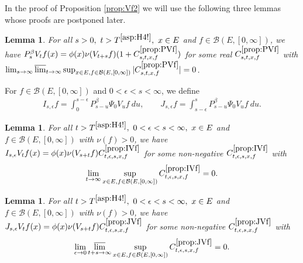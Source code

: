 \documentclass[12pt,a4paper]{amsart}
\numberwithin{equation}{section}
\theoremstyle{plain}
\newtheorem{lem}[thm]{Lemma}
\theoremstyle{definition}
\theoremstyle{remark}
\begin{document}
	In the proof of Proposition \ref{prop:Vf2} we will use the following three lemmas whose proofs are postponed later.

\begin{lem} \label{prop:PVf}
	For all $s> 0,~t> T^{\eqref{asp:H4!}},~ x\in E$ and $f\in \mathcal B(E,[0,\infty])$, we have $P_s^\beta V_t f(x) = \phi(x) \nu(V_{t+s}f) (1+C^{\ref{prop:PVf}}_{s,t,x,f})$ for some real $C^{\ref{prop:PVf}}_{s,t,x,f}$ with 
	$\lim_{s\to \infty} \varlimsup_{t\to \infty} \sup_{x\in E, f\in \mathcal B(E,[0,\infty])} 
	|C^{\ref{prop:PVf}}_{s,t,x,f}| = 0$.
\end{lem}

For $f\in \mathcal B(E,[0,\infty])$ and $0 < \epsilon < s < \infty$, we define
\begin{align}
	I_{s,\epsilon} f
 	= \int_0^{s - \epsilon} P_{s - u}^\beta \Psi_0 V_u f ~du, \qquad
 	J_{s,\epsilon} f
 	= \int_{s-\epsilon}^s P_{s-u}^\beta \Psi_0 V_u f ~du.
\end{align}
\begin{lem} \label{prop:IVf}
	For all $t> T^{\eqref{asp:H4!}},~0<\epsilon<s< \infty,~x\in E$ and $f\in \mathcal B(E,[0,\infty])$ with $\nu(f)>0$, we have $I_{s,\epsilon}V_t f(x) = \phi(x) \nu(V_{s+t} f) C^{\ref{prop:IVf}}_{t,\epsilon, s, x,f}$ for some non-negative $C^{\ref{prop:IVf}}_{t,\epsilon, s, x,f}$ with 
\[
\lim_{t\to \infty} \sup_{x\in E, f\in \mathcal B(E,[0,\infty])} 
C^{\ref{prop:IVf}}_{t,\epsilon, s, x,f} = 0.
\]
\end{lem}

\begin{lem} \label{prop:JVf}
For all $t>T^{\eqref{asp:H4!}},~0<\epsilon<s< \infty,~x\in E$ and $f\in \mathcal B(E,[0,\infty])$ with $\nu(f)>0$, we have $ J_{s,\epsilon} V_tf(x) = \phi(x) \nu(V_{s+t}f) C^{\ref{prop:JVf}}_{t,\epsilon,s,x,f}$ for some non-negative $C^{\ref{prop:JVf}}_{t,\epsilon,s,x,f}$ with 
\[
\lim_{\epsilon \to 0}\varlimsup_{t+s\to \infty} 
\sup_{x\in E, f\in \mathcal B(E,[0,\infty])} 
C^{\ref{prop:JVf}}_{t,\epsilon,s,x,f} =0.
\]
\end{lem}
\end{document}
